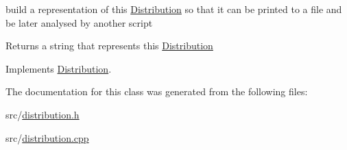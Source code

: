 build a representation of this \mbox{\hyperlink{class_distribution}{Distribution}} so that it can be printed to a file and be later analysed by another script 

\begin{DoxyReturn}{Returns}
a string that represents this \mbox{\hyperlink{class_distribution}{Distribution}} 
\end{DoxyReturn}


Implements \mbox{\hyperlink{class_distribution_ac41d57a4d7f82041810f886590a236a5}{Distribution}}.



The documentation for this class was generated from the following files\+:\begin{DoxyCompactItemize}
\item 
src/\mbox{\hyperlink{distribution_8h}{distribution.\+h}}\item 
src/\mbox{\hyperlink{distribution_8cpp}{distribution.\+cpp}}\end{DoxyCompactItemize}
